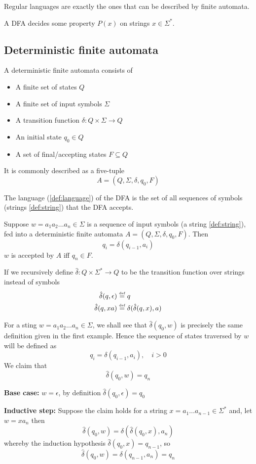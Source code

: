 Regular languages are exactly the ones that can be described by finite automata.

A DFA decides some property $P(x)$ on strings $x \in \Sigma^*$.

\subsection{Deterministic finite automata}
\begin{definition}[DFA] \label{def:dfa}
    A deterministic finite automata consists of 
    \begin{itemize}
        \item A finite set of states $Q$
        \item A finite set of input symbols $\Sigma$
        \item A transition function $\delta : Q\times \Sigma \rightarrow Q$
        \item An initial state $q_0 \in Q$
        \item A set of final/accepting states $F \subseteq Q$
    \end{itemize}
    It is commonly described as a five-tuple $$A = (Q, \Sigma, \delta, q_0, F)$$
\end{definition}

The language (\ref{def:language}) of the DFA is the set of all sequences of symbols (strings \ref{def:string}) that the DFA accepts. 
\begin{example}
    Suppose $w = a_1a_2 \dots a_n \in \Sigma$ is a sequence of input symbols (a string \ref{def:string}), fed into a deterministic finite automata $A = (Q, \Sigma, \delta, q_0, F)$. Then 
    $$q_i = \delta(q_{i-1}, a_i)$$
    $w$ is accepted by $A$ iff $q_n \in F$.
\end{example}

If we recursively define $\hat\delta: Q \times \Sigma^* \rightarrow Q$ to be the transition function over strings instead of symbols
\begin{align*}
    \hat\delta(q, \epsilon) &\stackrel {\mbox{\tiny def}}{=} q \\
    \hat\delta(q, xa) &\stackrel {\mbox{\tiny def}}{=} \delta(\hat\delta(q,x), a)
\end{align*}

\begin{example}
    For a sting $w = a_1 a_2 \dots a_n \in \Sigma$, we shall see that $\hat\delta(q_0, w)$ is precisely the same definition given in the first example. Hence the sequence of states traversed by $w$ will be defined as $$q_i = \delta(q_{i-1}, a_i), \quad i > 0$$ We claim that $$\hat\delta(q_0, w) = q_n$$
    
    \textbf{Base case:} $w = \epsilon$, by definition $\hat\delta(q_0, \epsilon) = q_0$ 
    
    \textbf{Inductive step:} Suppose the claim holds for a string $x = a_1 \dots a_{n-1} \in \Sigma^*$ and, let $w = xa_n$ then $$\hat\delta(q_0, w) = \delta(\hat\delta(q_0,x), a_n)$$
    whereby the induction hypothesis $\hat\delta(q_0,x) = q_{n-1}$, so $$\hat\delta(q_0, w) = \delta(q_{n-1}, a_n) = q_n$$
\end{example}

